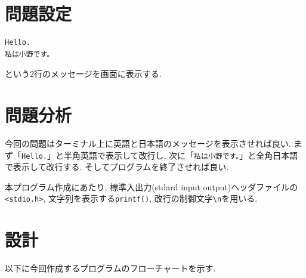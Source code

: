 \documentclass[a4paper, xelatex, ja=standard, 10.5pt]{bxjsarticle}
\begin{document}


\section{問題設定}
\begin{lstlisting}
Hello.
私は小野です。
\end{lstlisting}
という2行のメッセージを画面に表示する.

\section{問題分析}
今回の問題はターミナル上に英語と日本語のメッセージを表示させれば良い.
まず「\texttt{Hello.}」と半角英語で表示して改行し,
次に「\texttt{私は小野です。}」と全角日本語で表示して改行する.
そしてプログラムを終了させれば良い.

本プログラム作成にあたり,
標準入出力(stdard input output)ヘッダファイルの\texttt{<stdio.h>},
文字列を表示する\texttt{printf()},
改行の制御文字\texttt{\textbackslash n}を用いる.

\section{設計}
以下に今回作成するプログラムのフローチャートを示す.
\end{document}
